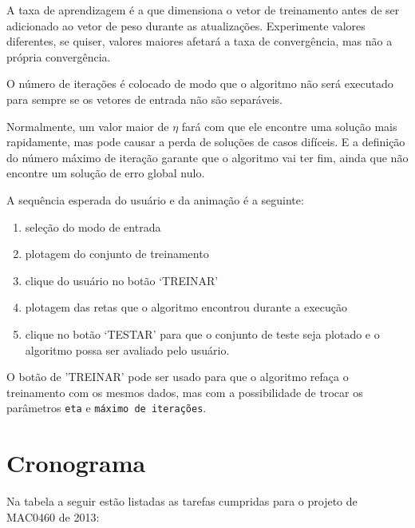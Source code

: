 \documentclass[brazil, a4paper]{article}
\begin{document}
A taxa de aprendizagem é a que dimensiona o vetor de treinamento antes de ser
adicionado ao vetor de peso durante as atualizações. Experimente valores
diferentes, se quiser, valores maiores afetará a taxa de convergência, mas não a
própria convergência.

O número de iterações é colocado de modo que o algoritmo não será executado para
sempre se os vetores de entrada não são separáveis.

Normalmente, um valor maior de $\eta$ fará com que ele encontre uma solução mais
rapidamente, mas pode causar a perda de soluções de casos difíceis. E a
definição do número máximo de iteração garante que o algoritmo vai ter fim,
ainda que não encontre um solução de erro global nulo.

A sequência esperada do usuário e da animação é a seguinte:

\begin{enumerate}
	
	\item seleção do modo de entrada
	
	\item plotagem do conjunto de treinamento 
	
	\item clique do usuário no botão `TREINAR'
	
	\item plotagem das retas que o algoritmo encontrou durante a execução 
	
	\item clique no botão `TESTAR' para que o conjunto de teste seja plotado e o
	algoritmo possa ser avaliado pelo usuário.

\end{enumerate}

O botão de 'TREINAR' pode ser usado para que o algoritmo refaça o treinamento
com os mesmos dados, mas com a possibilidade de trocar os parâmetros
\texttt{eta} e \texttt{máximo de iterações}.

\section{Cronograma}

Na tabela a seguir estão listadas as tarefas cumpridas para o projeto de MAC0460
de 2013:
\end{document}
